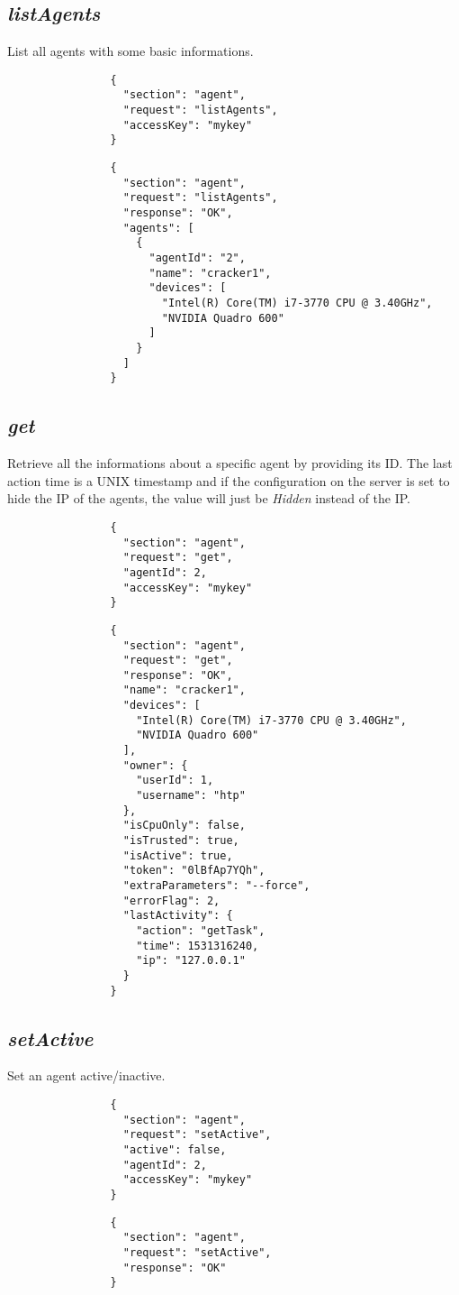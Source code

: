 \documentclass{article}
\begin{document}
		\subsection*{\textit{listAgents}}
			List all agents with some basic informations.
			{
				\color{blue}
				\begin{verbatim}
				{
				  "section": "agent",
				  "request": "listAgents",
				  "accessKey": "mykey"
				}
				\end{verbatim}
			}
			{
				\color{OliveGreen}
				\begin{verbatim}
				{
				  "section": "agent",
				  "request": "listAgents",
				  "response": "OK",
				  "agents": [
				    {
				      "agentId": "2",
				      "name": "cracker1",
				      "devices": [
				        "Intel(R) Core(TM) i7-3770 CPU @ 3.40GHz",
				        "NVIDIA Quadro 600"
				      ]
				    }
				  ]
				}
				\end{verbatim}
			}
		\subsection*{\textit{get}}
			Retrieve all the informations about a specific agent by providing its ID. The last action time is a UNIX timestamp and if the configuration on the server is set to hide the IP of the agents, the value will just be \textit{Hidden} instead of the IP.
			{
				\color{blue}
				\begin{verbatim}
				{
				  "section": "agent",
				  "request": "get",
				  "agentId": 2,
				  "accessKey": "mykey"
				}
				\end{verbatim}
			}
			{
				\color{OliveGreen}
				\begin{verbatim}
				{
				  "section": "agent",
				  "request": "get",
				  "response": "OK",
				  "name": "cracker1",
				  "devices": [
				    "Intel(R) Core(TM) i7-3770 CPU @ 3.40GHz",
				    "NVIDIA Quadro 600"
				  ],
				  "owner": {
				    "userId": 1,
				    "username": "htp"
				  },
				  "isCpuOnly": false,
				  "isTrusted": true,
				  "isActive": true,
				  "token": "0lBfAp7YQh",
				  "extraParameters": "--force",
				  "errorFlag": 2,
				  "lastActivity": {
				    "action": "getTask",
				    "time": 1531316240,
				    "ip": "127.0.0.1"
				  }
				}
				\end{verbatim}
			}
		\subsection*{\textit{setActive}}
			Set an agent active/inactive. 
			{
				\color{blue}
				\begin{verbatim}
				{
				  "section": "agent",
				  "request": "setActive",
				  "active": false,
				  "agentId": 2,
				  "accessKey": "mykey"
				}
				\end{verbatim}
			}
			{
				\color{OliveGreen}
				\begin{verbatim}
				{
				  "section": "agent",
				  "request": "setActive",
				  "response": "OK"
				}
				\end{verbatim}
			}
\end{document}
